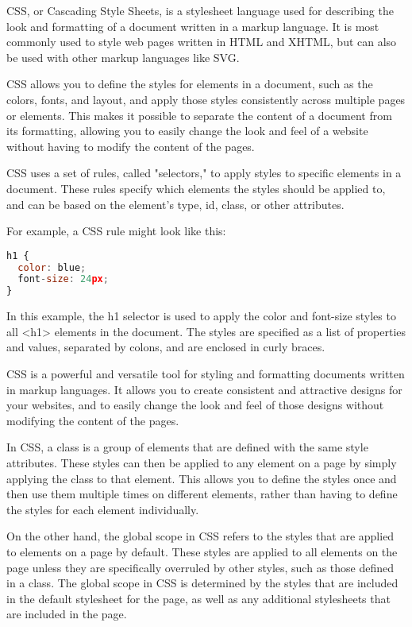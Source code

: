 {CSS, or Cascading Style Sheets, is a stylesheet language used for describing the look and formatting of a document written in a markup language. It is most commonly used to style web pages written in HTML and XHTML, but can also be used with other markup languages like SVG.

CSS allows you to define the styles for elements in a document, such as the colors, fonts, and layout, and apply those styles consistently across multiple pages or elements. This makes it possible to separate the content of a document from its formatting, allowing you to easily change the look and feel of a website without having to modify the content of the pages.

CSS uses a set of rules, called "selectors," to apply styles to specific elements in a document. These rules specify which elements the styles should be applied to, and can be based on the element's type, id, class, or other attributes.

For example, a CSS rule might look like this:

\begin{lstlisting}[language=Javascript, nolol]
h1 {
  color: blue;
  font-size: 24px;
}
\end{lstlisting}

In this example, the h1 selector is used to apply the color and font-size styles to all <h1> elements in the document. The styles are specified as a list of properties and values, separated by colons, and are enclosed in curly braces.

CSS is a powerful and versatile tool for styling and formatting documents written in markup languages. It allows you to create consistent and attractive designs for your websites, and to easily change the look and feel of those designs without modifying the content of the pages.


In CSS, a class is a group of elements that are defined with the same style attributes. These styles can then be applied to any element on a page by simply applying the class to that element. This allows you to define the styles once and then use them multiple times on different elements, rather than having to define the styles for each element individually.

On the other hand, the global scope in CSS refers to the styles that are applied to elements on a page by default. These styles are applied to all elements on the page unless they are specifically overruled by other styles, such as those defined in a class. The global scope in CSS is determined by the styles that are included in the default stylesheet for the page, as well as any additional stylesheets that are included in the page.

}
